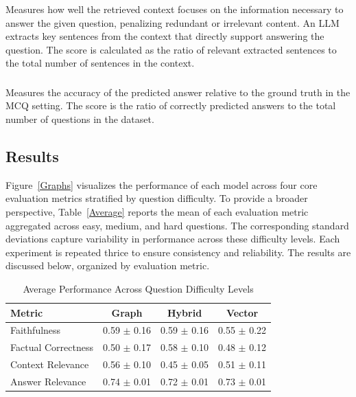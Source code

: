 \documentclass[10pt, conference]{IEEEtran}
\begin{document}
\subsubsection{}Measures how well the retrieved context focuses on the information necessary to answer the given question, penalizing redundant or irrelevant content. An LLM extracts key sentences from the context that directly support answering the question. The score is calculated as the ratio of relevant extracted sentences to the total number of sentences in the context.
\subsubsection{}Measures the accuracy of the predicted answer relative to the ground truth in the MCQ setting. The score is the ratio of correctly predicted answers to the total number of questions in the dataset.

\subsection{Results}
Figure~\ref{Graphs} visualizes the performance of each model across four core evaluation metrics stratified by question difficulty. To provide a broader perspective, Table~\ref{Average} reports the mean of each evaluation metric aggregated across easy, medium, and hard questions. The corresponding standard deviations capture variability in performance across these difficulty levels. Each experiment is repeated thrice to ensure consistency and reliability. The results are discussed below, organized by evaluation metric.

\begin{table}[htbp]
\caption{Average Performance Across Question Difficulty Levels}
\label{Average}
\small
\begin{center}
\renewcommand{\arraystretch}{1.5}
\begin{tabular}{@{}lccc@{}}
\hline
\textbf{Metric} & \textbf{Graph} & \textbf{Hybrid} & \textbf{Vector} \\
\hline
    Faithfulness & 0.59 $\pm$ 0.16 & 0.59 $\pm$ 0.16 & 0.55 $\pm$ 0.22 \\
    Factual Correctness & 0.50 $\pm$ 0.17 & 0.58 $\pm$ 0.10 & 0.48 $\pm$ 0.12 \\
    Context Relevance & 0.56 $\pm$ 0.10 & 0.45 $\pm$ 0.05 & 0.51 $\pm$ 0.11 \\
    Answer Relevance & 0.74 $\pm$ 0.01 & 0.72 $\pm$ 0.01 & 0.73 $\pm$ 0.01 \\
\hline
\end{tabular}
\label{tab1}
\end{center}
\end{table}
\end{document}
